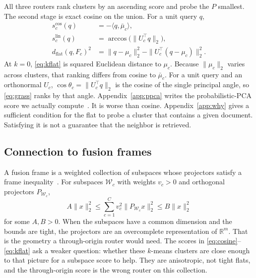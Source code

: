 \documentclass[sigconf,nonacm]{acmart}
\begin{document}
All three routers rank clusters by an ascending score and probe the $P$ smallest. The second stage is exact cosine on the union. For a unit query $q$,
\begin{align}
  s_c^{\mathrm{cos}}(q) &= -\langle q, \bar\mu_c \rangle, \label{eq:cosine} \\
  s_c^{\mathrm{lin}}(q) &= \arccos\big(\|U_c^\top q\|_2\big), \label{eq:grass} \\
  d_{\mathrm{flat}}(q, F_c)^2 &= \|q - \mu_c\|_2^2 - \|U_c^\top (q - \mu_c)\|_2^2. \label{eq:kflat}
\end{align}
At $k = 0$, \eqref{eq:kflat} is squared Euclidean distance to $\mu_c$. Because $\|\mu_c\|_2$ varies across clusters, that ranking differs from cosine to $\bar\mu_c$. For a unit query and an orthonormal $U_c$, $\cos\theta_c = \|U_c^\top q\|_2$ is the cosine of the single principal angle, so \eqref{eq:grass} ranks by that angle. Appendix~\ref{app:ppca} writes the probabilistic-PCA score we actually compute~\cite{tipping1999ppca,tipping1999mppca}. It is worse than cosine. Appendix~\ref{app:why} gives a sufficient condition for the flat to probe a cluster that contains a given document. Satisfying it is not a guarantee that the neighbor is retrieved.

\subsection{Connection to fusion frames}
\label{subsec:fusion-frames}

A fusion frame is a weighted collection of subspaces whose projectors satisfy a frame inequality~\cite{casazza2008fusion}. For subspaces $\mathcal{W}_c$ with weights $v_c > 0$ and orthogonal projectors $P_{\mathcal{W}_c}$,
\begin{equation}
  A \|x\|_2^2 \le \sum_{c=1}^{C} v_c^2 \|P_{\mathcal{W}_c} x\|_2^2 \le B \|x\|_2^2
  \label{eq:fusion}
\end{equation}
for some $A, B > 0$. When the subspaces have a common dimension and the bounds are tight, the projectors are an overcomplete representation of $\mathbb{R}^m$. That is the geometry a through-origin router would need. The scores in \eqref{eq:cosine}--\eqref{eq:kflat} ask a weaker question: whether these $k$-means clusters are close enough to that picture for a subspace score to help. They are anisotropic, not tight flats, and the through-origin score is the wrong router on this collection.
\end{document}
